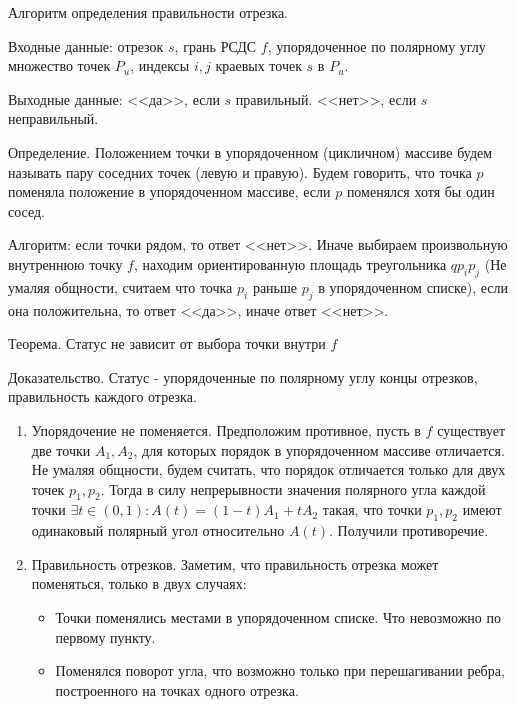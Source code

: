 \documentclass[letterpaper,12pt]{article}
\begin{document}
\begin{center}
      Алгоритм определения правильности отрезка.
\end{center}

Входные данные: отрезок $s$, грань РСДС $f$, упорядоченное по 
полярному углу множество точек $P_u$, индексы $i, j$ краевых точек $s$
в $P_u$.

Выходные данные: <<да>>, если $s$ правильный. <<нет>>, если $s$ 
неправильный.

\begin{center}
Определение.
Положением точки в упорядоченном (цикличном) массиве будем называть пару соседних точек
(левую и правую). Будем говорить, что точка $p$ поменяла положение в упорядоченном массиве,
если $p$ поменялся хотя бы один сосед.
\end{center}

Алгоритм: если точки рядом, то ответ <<нет>>. Иначе
выбираем произвольную внутреннюю точку $f$, находим ориентированную
площадь треугольника $q p_i p_j$ (Не умаляя общности, считаем что
точка $p_i$ раньше $p_j$ в упорядоченном списке), если она положительна,
то ответ <<да>>, иначе ответ <<нет>>.

\hspace{4em}

\begin{center}
      Теорема. Статус не зависит от выбора точки внутри $f$
\end{center}
Доказательство.
Статус - упорядоченные по полярному углу концы отрезков, правильность каждого 
отрезка.
\begin{enumerate}
      \item Упорядочение не поменяется.
            Предположим противное, пусть в $f$ существует две точки $A_1, A_2$, 
            для которых порядок в упорядоченном массиве отличается. Не умаляя 
            общности, будем считать, что порядок отличается только для двух
            точек $p_1, p_2$. Тогда в силу непрерывности значения полярного 
            угла каждой точки  $\exists t \in (0, 1) : A(t) = (1 - t)A_1 + tA_2$ 
            такая, что точки $p_1, p_2$ имеют одинаковый полярный угол 
            относительно $ A(t) $. Получили противоречие. 
      \item Правильность отрезков.
            Заметим, что правильность отрезка может поменяться, только в двух 
            случаях:
            \begin{itemize}
                  \item Точки поменялись местами в упорядоченном списке. Что 
                        невозможно по первому пункту.
                  \item Поменялся поворот угла, что возможно только при 
                        перешагивании ребра, построенного на точках одного 
                        отрезка.
            \end{itemize}
\end{enumerate}
\end{document}

